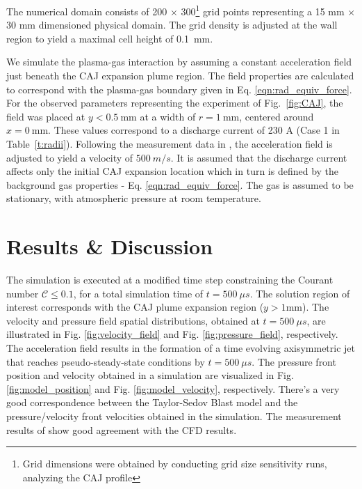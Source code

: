 \documentclass[a4paper]{iacas}%
\begin{document}
The numerical domain consists of 200 $\times$ 300\footnote{Grid dimensions were obtained by conducting grid size sensitivity runs, analyzing the CAJ profile} grid points representing a 15 mm $\times$ 30 mm dimensioned physical domain. The grid density is adjusted at the wall region to yield a maximal cell height of 0.1~mm. 

We simulate the plasma-gas interaction by assuming a constant acceleration field just beneath the CAJ expansion plume region. The field properties are calculated to correspond with the plasma-gas boundary given in Eq. \eqref{eqn:rad_equiv_force}. For the observed parameters representing the experiment \cite{KR} of Fig.~\ref{fig:CAJ}, the field was placed at $ y < 0.5~ \mathrm{mm} $ at a width of $r = 1~\mathrm{mm}$, centered around $x=0~\mathrm{mm}$. These values correspond to a discharge current of 230 A (Case 1 in Table~\ref{t:radii}).
Following the measurement data in \cite{KRClose}, the acceleration field is adjusted to yield a velocity of $500~ m/s$. It is assumed that the discharge current affects only the initial CAJ expansion location which in turn is defined by the background gas properties - Eq. \eqref{eqn:rad_equiv_force}. The gas is assumed to be stationary, with atmospheric pressure at room temperature.

\section{Results \& Discussion}

The simulation is executed at a modified time step constraining the Courant number $\mathcal{C} \leq 0.1$, for a total simulation time of $t = 500~\mu s$. The solution region of interest corresponds with the CAJ plume expansion region ($ y > 1 \mathrm{mm} $). The velocity and pressure field spatial distributions, obtained at $ t = 500~\mu s $, are illustrated in Fig. \ref{fig:velocity_field} and Fig. \ref{fig:pressure_field}, respectively. The acceleration field results in the formation of a time evolving axisymmetric jet that reaches pseudo-steady-state conditions by $t = 500~\mu s$.
The pressure front position and velocity obtained in a simulation are visualized in Fig. \ref{fig:model_position} and Fig. \ref{fig:model_velocity}, respectively. There's a very good correspondence between the Taylor-Sedov \cite{TAYLOR,SEDOV} Blast model and the pressure/velocity front velocities obtained in the simulation. The measurement results of \cite{KR} show good agreement with the CFD results.
\end{document}

